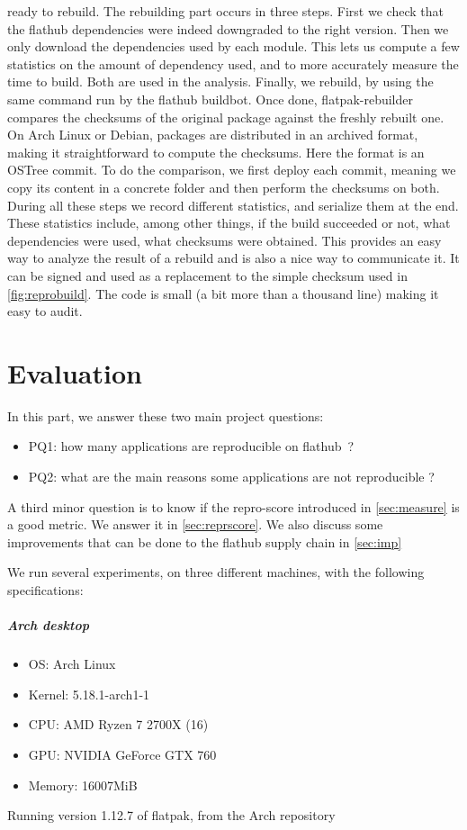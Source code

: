 \documentclass[a4paper,11pt,oneside]{report}
\theoremstyle{definition}
\newcommand{\sysname}{flatpak-rebuilder\xspace}
\newcommand{\fp}{flatpak\xspace}
\newcommand{\fh}{flathub\xspace}
\newcommand{\fhbb}{flathub buildbot\xspace}
\newcommand{\ot}{OSTree\xspace}
\begin{document}
ready to rebuild. The rebuilding part occurs in three steps. First we check
that the \fh dependencies were indeed downgraded to the right version. Then we
only download the dependencies used by each module. This lets us compute a few
statistics on the amount of dependency used, and to more accurately measure the
time to build. Both are used in the analysis. Finally, we rebuild, by using the
same command run by the \fhbb. Once done, \sysname compares the checksums of
the original package against the freshly rebuilt one. On Arch Linux or Debian,
packages are distributed in an archived format, making it straightforward to
compute the checksums. Here the format is an \ot commit. To do the
comparison, we first deploy each commit, meaning we copy its content in a
concrete folder and then perform the checksums on both. During all these steps
we record different statistics, and serialize them at the end. These statistics
include, among other things, if the build succeeded or not, what dependencies
were used, what checksums were obtained. This provides an easy way to analyze
the result of a rebuild and is also a nice way to communicate it. It can be
signed and used as a replacement to the simple checksum used in
\autoref{fig:reprobuild}. The code is small (a bit more than a thousand line)
making it easy to audit.

\chapter{Evaluation}
\label{chap:eval}

In this part, we answer these two main project questions:
\begin{itemize}
    \item PQ1: how many applications are reproducible on \fh~?
    \item PQ2: what are the main reasons some applications are not reproducible ?
\end{itemize}
A third minor question is to know if the repro-score introduced in
\autoref{sec:measure} is a good metric. We answer it in
\autoref{sec:reprscore}. We also discuss some improvements that can be done to
the \fh supply chain in \autoref{sec:imp}

\noindent
We run several experiments, on three different machines, with the following
specifications:
\paragraph{Arch desktop}
\begin{itemize}
    \label{arch-desktop}
    \item OS: Arch Linux
    \item Kernel: 5.18.1-arch1-1
    \item CPU: AMD Ryzen 7 2700X (16)
    \item GPU: NVIDIA GeForce GTX 760
    \item Memory: 16007MiB
\end{itemize}
Running version 1.12.7 of \fp, from the Arch repository
\end{document}
